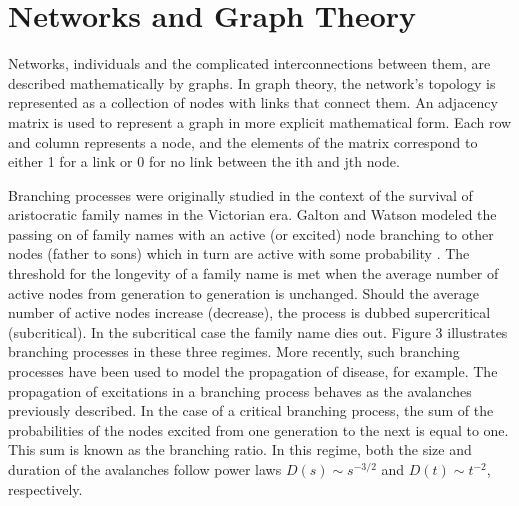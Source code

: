 \documentclass[12pt]{article}
\begin{document}
\section*{Networks and Graph Theory}

Networks, individuals and the complicated interconnections between them, are described mathematically by graphs. In graph theory, the network's topology is represented as a collection of nodes with links that connect them. An adjacency matrix is used to represent a graph in more explicit mathematical form. Each row and column represents a node, and the elements of the matrix correspond to either 1 for a link or 0 for no link between the ith and jth node.

Branching processes were originally studied in the context of the survival of aristocratic family names in the Victorian era. Galton and Watson modeled the passing on of family names with an active (or excited) node branching to other nodes (father to sons) which in turn are active with some probability \cite{Watson2014}. The threshold for the longevity of a family name is met when the average number of active nodes from generation to generation is unchanged. Should the average number of active nodes increase (decrease), the process is dubbed supercritical (subcritical). In the subcritical case the family name dies out. Figure 3 illustrates branching processes in these three regimes. More recently, such branching processes have been used to model the propagation of disease, for example. The propagation of excitations in a branching process behaves as the avalanches previously described. In the case of a critical branching process, the sum of the probabilities of the nodes excited from one generation to the next is equal to one. This sum is known as the branching ratio. In this regime, both the size and duration of the avalanches follow power laws $ D(s) \sim s^{-3/2} $ and $ D(t) \sim t^{-2} $, respectively. \cite{Larremore2014}
\end{document}
